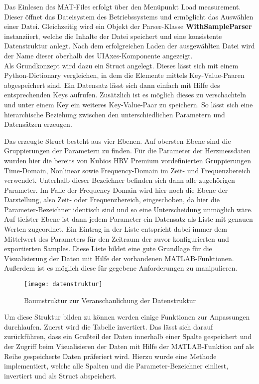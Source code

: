 Das Einlesen des MAT-Files erfolgt über den Menüpunkt \glqq Load measurement\grqq{}. Dieser öffnet das Dateisystem des Betriebssystems und ermöglicht das Auswählen einer Datei. Gleichzeitig wird ein Objekt der Parser-Klasse \textbf{WithSampleParser} instanziiert, welche die Inhalte der Datei speichert und eine konsistente Datenstruktur anlegt. Nach dem erfolgreichen Laden der ausgewählten Datei wird der Name dieser oberhalb des UIAxes-Komponente angezeigt.\\
Als Grundkonzept wird dazu ein Struct angelegt. Dieses lässt sich mit einem Python-Dictionary vergleichen, in dem die Elemente mittels Key-Value-Paaren abgespeichert sind. Ein Datensatz lässt sich dann einfach mit Hilfe des entsprechenden Keys aufrufen. Zusätzlich ist es möglich dieses zu verschachteln und unter einem Key ein weiteres Key-Value-Paar zu speichern. So lässt sich eine hierarchische Beziehung zwischen den unterschiedlichen Parametern und Datensätzen erzeugen.\cite{pythonDict}

Das erzeugte Struct besteht aus vier Ebenen. Auf obersten Ebene sind die Gruppierungen der Parametern zu finden. Für die Parameter der Herzmessdaten wurden hier die bereits von Kubios HRV Premium vordefinierten Gruppierungen Time-Domain, Nonlinear sowie Frequency-Domain im Zeit- und Frequenzbereich verwendet. Unterhalb dieser Bezeichner befinden sich dann alle zugehörigen Parameter. Im Falle der Frequency-Domain wird hier noch die Ebene der Darstellung, also Zeit- oder Frequenzbereich, eingeschoben, da hier die Parameter-Bezeichner identisch sind und so eine Unterscheidung unmöglich wäre. Auf tiefster Ebene ist dann jedem Parameter ein Datensatz als Liste mit genauen Werten zugeordnet. Ein Eintrag in der Liste entspricht dabei immer dem Mittelwert des Parameters für den Zeitraum der zuvor konfigurierten und exportierten Samples. Diese Liste bildet eine gute Grundlage für die Visualisierung der Daten mit Hilfe der vorhandenen MATLAB-Funktionen. Außerdem ist es möglich diese für gegebene Anforderungen zu manipulieren.

\begin{figure}[H]
	\centering
	\texttt{[image: datenstruktur]}
	\caption{Baumstruktur zur Veranschaulichung der Datenstruktur}
	\label{fig:datenstruktur}
\end{figure}

Um diese Struktur bilden zu können werden einige Funktionen zur Anpassungen durchlaufen. Zuerst wird die Tabelle invertiert. Das lässt sich darauf zurückführen, dass ein Großteil der Daten innerhalb einer Spalte gespeichert und der Zugriff beim Visualisieren der Daten mit Hilfe der MATLAB-Funktion auf als Reihe gespeicherte Daten präferiert wird. Hierzu wurde eine Methode implementiert, welche alle Spalten und die Parameter-Bezeichner einliest, invertiert und als Struct abspeichert.

